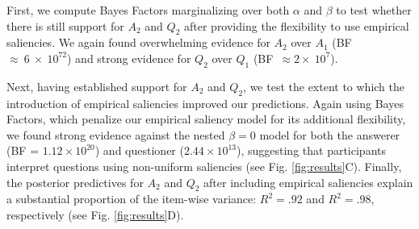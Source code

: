 \documentclass[12pt, floatsintext, jou]{apa6}
\newcommand{\ndg}[1]{\textcolor{Green}{[ndg: #1]}}
\begin{document}
First, we compute Bayes Factors marginalizing over both $\alpha$ and $\beta$ to test whether there is still support for $A_2$ and $Q_2$ after providing the flexibility to use empirical saliencies. We again found overwhelming evidence for $A_2$ over $A_1$ (BF~$\approx~6~\times~10^{72}$) and strong evidence for $Q_2$ over $Q_1$ (BF~$\approx2\times~10^{7}$).

Next, having established support for $A_2$ and $Q_2$, we test the extent to which the introduction of empirical saliencies improved our predictions. Again using Bayes Factors, which penalize our empirical saliency model for its additional flexibility, we found strong evidence against the nested $\beta=0$ model for both the answerer (BF = $1.12\times 10^{20}$) and questioner ($2.44 \times 10^{13}$), suggesting that participants interpret questions using non-uniform saliencies (see Fig. \ref{fig:results}C). Finally, the posterior predictives for $A_2$ and $Q_2$ after including empirical saliencies explain a substantial proportion of the item-wise variance: $R^2 = .92$ and $R^2 = .98$, respectively (see Fig. \ref{fig:results}D). %




\end{document}
